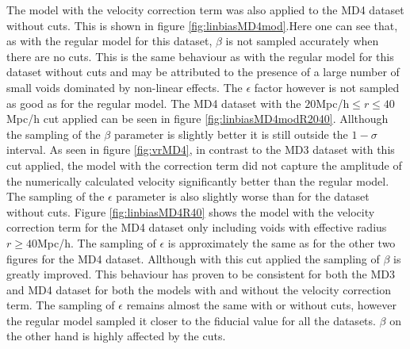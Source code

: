 The model with the velocity correction term was also applied to the MD4 dataset without cuts. This is shown in figure \ref{fig:linbiasMD4mod}.Here one can see that, as with the regular model for this dataset, $\beta$ is not sampled accurately when there are no cuts. 
This is the same behaviour as with the regular model for this dataset without cuts and may be attributed to the presence of a large number of small voids dominated by non-linear effects. The $\epsilon$ factor however is not sampled as good as for the regular model. The MD4 dataset with the $20$Mpc/h$\leq r\leq 40$Mpc/h cut applied can be seen in figure \ref{fig:linbiasMD4modR2040}. Allthough the sampling of the $\beta$ parameter is slightly better it is still outside the $1-\sigma$ interval. As seen in figure \ref{fig:vrMD4}, in contrast to the MD3 dataset with this cut applied, the model with the correction term did not capture the amplitude of the numerically calculated velocity significantly better than the regular model. The sampling of the $\epsilon$ parameter is also slightly worse than for the dataset without cuts. Figure \ref{fig:linbiasMD4R40} shows the model with the velocity correction term for the MD4 dataset only including voids with effective radius $r\geq 40$Mpc/h. The sampling of $\epsilon$ is approximately the same as for the other two figures for the MD4 dataset. Allthough with this cut applied the sampling of $\beta$ is greatly improved. This behaviour has proven to be consistent for both the MD3 and MD4 dataset for both the models with and without the velocity correction term. The sampling of $\epsilon$ remains almost the same with or without cuts, however the regular model sampled it closer to the fiducial value for all the datasets. $\beta$ on the other hand is highly affected by the cuts.

